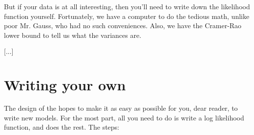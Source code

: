 But if your data is at all interesting, then you'll need to write down
the likelihood function yourself.  Fortunately, we have a computer to
do the tedious math, unlike poor Mr. Gauss, who had no such conveniences.
Also, we have the Cramer-Rao lower bound to tell us what the variances
are. 

[...]


\section{Writing your own}
The design of the  hopes to make it as easy as possible for you,
dear reader, to write new models. For the most part, all you need to
do is write a log likelihood function, and 
does the rest. The steps:


